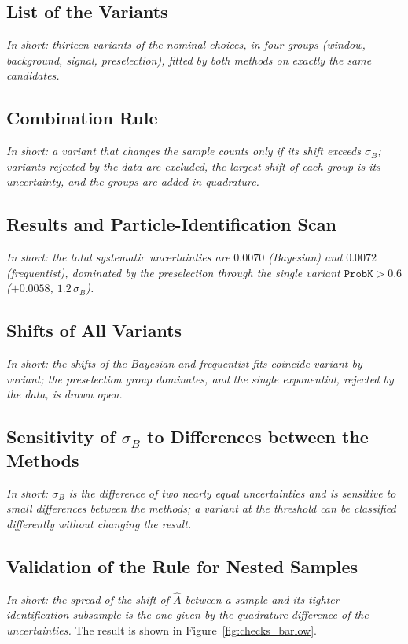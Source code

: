 \subsection{List of the Variants}
\emph{In short: thirteen variants of the nominal choices, in four groups (window, background, signal, preselection), fitted by both methods on exactly the same candidates.}

\subsection{Combination Rule}
\emph{In short: a variant that changes the sample counts only if its shift exceeds $\sigma_B$; variants rejected by the data are excluded, the largest shift of each group is its uncertainty, and the groups are added in quadrature.}

\subsection{Results and Particle-Identification Scan}
\label{app:syst_results}
\emph{In short: the total systematic uncertainties are $0.0070$ (Bayesian) and $0.0072$ (frequentist), dominated by the preselection through the single variant $\texttt{ProbK}>0.6$ ($+0.0058$, $1.2\,\sigma_B$).}

\subsection{Shifts of All Variants}
\label{app:syst_variants}
\emph{In short: the shifts of the Bayesian and frequentist fits coincide variant by variant; the preselection group dominates, and the single exponential, rejected by the data, is drawn open.}

\subsection{Sensitivity of $\sigma_B$ to Differences between the Methods}
\emph{In short: $\sigma_B$ is the difference of two nearly equal uncertainties and is sensitive to small differences between the methods; a variant at the threshold can be classified differently without changing the result.}

\subsection{Validation of the Rule for Nested Samples}
\label{sec:checks_barlow}
\emph{In short: the spread of the shift of $\hat A$ between a sample and its tighter-identification subsample is the one given by the quadrature difference of the uncertainties.}
The result is shown in Figure~\ref{fig:checks_barlow}.

